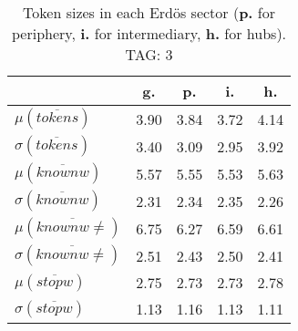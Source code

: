 \begin{table}[h!]
\begin{center}
\begin{tabular}{| l || c | c | c | c |}\hline
 & {\bf g.} & {\bf p.} & {\bf i.} & {\bf h.} \\\hline\hline
$\mu(\overline{tokens})$ & 3.90  & 3.84  & 3.72  & 4.14 \\
$\sigma(\overline{tokens})$ & 3.40  & 3.09  & 2.95  & 3.92 \\\hline
$\mu(\overline{knownw})$ & 5.57  & 5.55  & 5.53  & 5.63 \\
$\sigma(\overline{knownw})$ & 2.31  & 2.34  & 2.35  & 2.26 \\\hline
$\mu(\overline{knownw \neq})$ & 6.75  & 6.27  & 6.59  & 6.61 \\
$\sigma(\overline{knownw \neq})$ & 2.51  & 2.43  & 2.50  & 2.41 \\\hline
$\mu(\overline{stopw})$ & 2.75  & 2.73  & 2.73  & 2.78 \\
$\sigma(\overline{stopw})$ & 1.13  & 1.16  & 1.13  & 1.11 \\\hline
\end{tabular}
\caption{Token sizes in each Erd\"os sector ({{\bf p.}} for periphery, {{\bf i.}} for intermediary, {{\bf h.}} for hubs). TAG: 3}
\end{center}
\end{table}